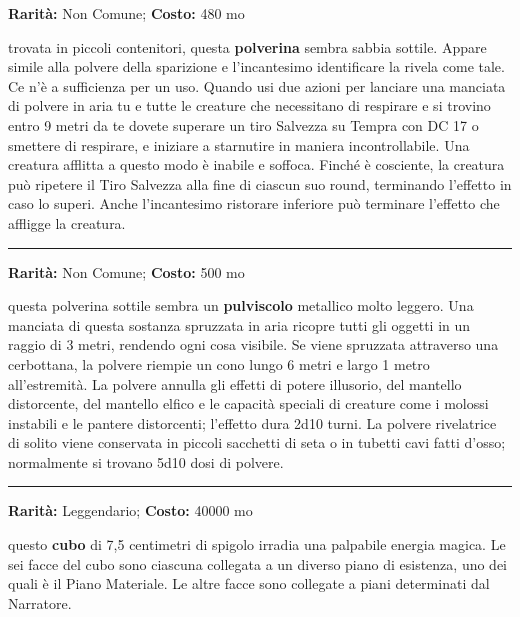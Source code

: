 \begin{multicols}{2}
\textbf{Rarità:} Non Comune; \textbf{Costo:} 480 mo

trovata in piccoli contenitori, questa \textbf{polverina} sembra sabbia sottile. Appare simile alla polvere della sparizione e l'incantesimo identificare la rivela come tale. Ce n'è a sufficienza per un uso. Quando usi due azioni per lanciare una manciata di polvere in aria tu e tutte le creature che necessitano di respirare e si trovino entro 9 metri da te dovete superare un tiro Salvezza su Tempra con DC 17 o smettere di respirare, e iniziare a starnutire in maniera incontrollabile. Una creatura afflitta a questo modo è inabile e soffoca. Finché è cosciente, la creatura può ripetere il Tiro Salvezza alla fine di ciascun suo round, terminando l'effetto in caso lo superi. Anche l'incantesimo ristorare inferiore può terminare l'effetto che affligge la creatura.

\smallskip\noindent\rule{\linewidth}{2pt}  \hypertarget{PolvereRivelatrice}{}\medskip{}\noindent\label{PolvereRivelatrice}

\textbf{Rarità:} Non Comune; \textbf{Costo:} 500 mo

questa polverina sottile sembra un \textbf{pulviscolo} metallico molto leggero. Una manciata di questa sostanza spruzzata in aria ricopre tutti gli oggetti in un raggio di 3 metri, rendendo ogni cosa visibile. Se viene spruzzata attraverso una cerbottana, la polvere riempie un cono lungo 6 metri e largo 1 metro all'estremità. La polvere annulla gli effetti di potere illusorio, del mantello distorcente, del mantello elfico e le capacità speciali di creature come i molossi instabili e le pantere distorcenti; l'effetto dura 2d10 turni. La polvere rivelatrice di solito viene conservata in piccoli sacchetti di seta o in tubetti cavi fatti d'osso; normalmente si trovano 5d10 dosi di polvere.

\smallskip\noindent\rule{\linewidth}{2pt}  \hypertarget{PortaleCubico}{}\medskip{}\noindent\label{PortaleCubico}

\textbf{Rarità:} Leggendario; \textbf{Costo:} 40000 mo

questo \textbf{cubo} di 7,5 centimetri di spigolo irradia una palpabile energia magica. Le sei facce del cubo sono ciascuna collegata a un diverso piano di esistenza, uno dei quali è il Piano Materiale. Le altre facce sono collegate a piani determinati dal Narratore.


\end{multicols}
